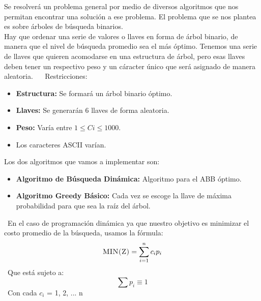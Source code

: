 \documentclass[10pt,letterpaper]{article}
\begin{document}
 \newline \newline 
        Se resolverá un problema general por medio de diversos algoritmos que nos 
        permitan encontrar una solución a ese problema. 
        El problema que se nos plantea es sobre árboles de búsqueda binarios. \\ 
        Hay que ordenar una serie de valores o llaves en forma de árbol binario, de manera que 
        el nivel de búsqueda promedio sea el más óptimo. 
        Tenemos una serie de llaves que quieren acomodarse en una estructura de árbol, 
        pero esas llaves deben tener un respectivo peso 
        y un cáracter único que será asignado de manera aleatoria. \ \ \newline \newline 
        Restricciones: 
        \begin{itemize} 
        \item \textbf{Estructura:} Se formará un árbol binario óptimo. 
        \item \textbf{Llaves:} Se generarán 6 llaves de forma aleatoria. 
        \item \textbf{Peso:} Varía entre $1 \leq C{i} \leq 1000$. 
        \item Los caracteres ASCII varían. 
        \end{itemize} 
        Los dos algoritmos que vamos a implementar son: 
        \begin{itemize} 
        \item \textbf{Algoritmo de Búsqueda Dinámica:} Algoritmo para el ABB óptimo. 
        \item \textbf{Algoritmo Greedy Básico:} Cada vez se escoge la llave de máxima probabilidad 
         para que sea la raíz del árbol. 
        \end{itemize} 
        \ En el caso de programación dinámica ya que nuestro objetivo es minimizar el costo promedio de la búsqueda, usamos la fórmula: 
        \[ \textsc{\normalsize MIN(Z)}\\[0.5cm] = \sum_{i=1}^{n}c_{i}p_{i} \] 
        \ Que está sujeto a:  
        \[ \sum p_{i} \equiv 1 \] 
        \ Con cada $c_{i}$ = 1, 2, ... n  
        \ \ \newline \newline 
        
\end{document}

